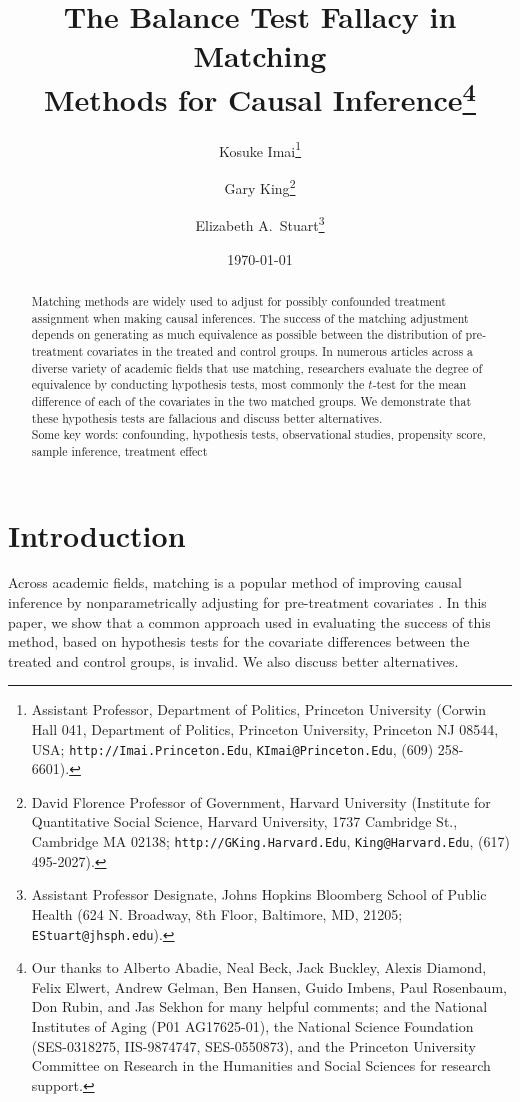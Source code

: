 \documentclass[11pt,titlepage]{article}
\title{The Balance Test Fallacy in Matching\\ Methods for Causal
  Inference\thanks{Our thanks to Alberto Abadie, Neal Beck, Jack
    Buckley, Alexis Diamond, Felix Elwert, Andrew Gelman, Ben Hansen,
    Guido Imbens, Paul Rosenbaum, Don Rubin, and Jas Sekhon for many
    helpful comments; and the National Institutes of Aging (P01
    AG17625-01), the National Science Foundation (SES-0318275,
    IIS-9874747, SES-0550873), and the Princeton University Committee
    on Research in the Humanities and Social Sciences for research
    support.}}
\author{Kosuke Imai\thanks{Assistant Professor, Department of
    Politics, Princeton University (Corwin Hall 041, Department of
    Politics, Princeton University, Princeton NJ 08544, USA;
    \texttt{http://Imai.Princeton.Edu}, \texttt{KImai@Princeton.Edu},
    (609) 258-6601).}  \and Gary King\thanks{David Florence Professor
    of Government, Harvard University (Institute for Quantitative
    Social Science, Harvard University, 1737 Cambridge St., Cambridge
    MA 02138; \texttt{http://GKing.Harvard.Edu},
    \texttt{King@Harvard.Edu}, (617) 495-2027).}  \and Elizabeth A.\ 
  Stuart\thanks{Assistant Professor Designate, Johns Hopkins Bloomberg
    School of Public Health (624 N. Broadway, 8th Floor, Baltimore,
    MD, 21205; \texttt{EStuart@jhsph.edu}).}}
\date{\today}
\begin{document}
\maketitle
{}\baselineskip

\pagebreak

\begin{abstract}
  Matching methods are widely used to adjust for possibly confounded
  treatment assignment when making causal inferences.  The success of
  the matching adjustment depends on generating as much equivalence as
  possible between the distribution of pre-treatment covariates in the
  treated and control groups.  In numerous articles across a diverse
  variety of academic fields that use matching, researchers evaluate
  the degree of equivalence by conducting hypothesis tests, most
  commonly the $t$-test for the mean difference of each of the
  covariates in the two matched groups.  We demonstrate that these
  hypothesis tests are fallacious and discuss better alternatives. \\ 
  Some key words: confounding, hypothesis tests, observational studies, propensity score, sample inference, treatment effect   
\end{abstract}

\section{Introduction}
Across academic fields, matching is a popular method of improving
causal inference by nonparametrically adjusting for pre-treatment
covariates \citep{Imbens04,Rosenbaum02,Rubin06}.  In this paper, we
show that a common approach used in evaluating the success of this
method, based on hypothesis tests for the covariate differences
between the treated and control groups, is invalid.  We also discuss
better alternatives.
\\
\end{document}
